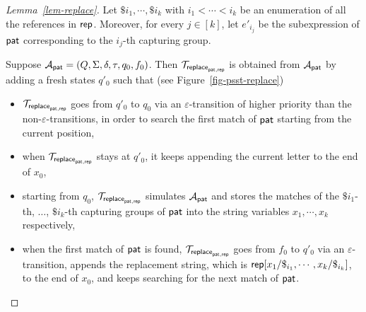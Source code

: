 \begin{proof}[Lemma~\ref{lem-replace}]
Let $\$i_1, \cdots, \$i_k$ with $i_1 < \cdots < i_k$ be an enumeration of all the references in $\mathsf{rep}$. 
Moreover, for every $j \in [k]$, let $e'_{i_j}$ be the subexpression of $\mathsf{pat}$ corresponding to the $i_j$-th capturing group.

Suppose $\mathcal{A}_{\mathsf{pat}} = (Q, \Sigma, \delta, \tau, q_0, f_0)$. Then $\mathcal{T}_{\mathsf{replace}_{\mathsf{pat},\mathsf{rep}}}$ is obtained from $\mathcal{A}_{\mathsf{pat}}$ by adding a fresh states $q'_0$ such that (see Figure~\ref{fig-psst-replace})
\begin{itemize}
\item $\mathcal{T}_{\mathsf{replace}_{\mathsf{pat},\mathsf{rep}}}$ goes from $q'_0$ to $q_0$ via an $\varepsilon$-transition of higher priority than the non-$\varepsilon$-transitions, in order to search the first match of $\mathsf{pat}$ starting from the current position, 
%
\item when $\mathcal{T}_{\mathsf{replace}_{\mathsf{pat},\mathsf{rep}}}$ stays at $q'_0$, it keeps appending the current letter to the end of $x_0$, 
%
\item starting from $q_0$, $\mathcal{T}_{\mathsf{replace}_{\mathsf{pat},\mathsf{rep}}}$ simulates $\mathcal{A}_{\mathsf{pat}}$ and stores the matches of the $\$i_1$-th, $\ldots$, $\$i_k$-th capturing groups of $\mathsf{pat}$ into the string variables $x_1, \cdots, x_k$ respectively,   
%
\item when the first match of $\mathsf{pat}$ is found, $\mathcal{T}_{\mathsf{replace}_{\mathsf{pat},\mathsf{rep}}}$ goes from $f_0$ to $q'_0$ via an $\varepsilon$-transition, appends the replacement string, which is $\mathsf{rep}[x_1/\$_{i_1}, \cdots, x_k/\$_{i_k}]$, to the end of $x_0$, and keeps searching for the next match of $\mathsf{pat}$.
\end{itemize}


\end{proof}
